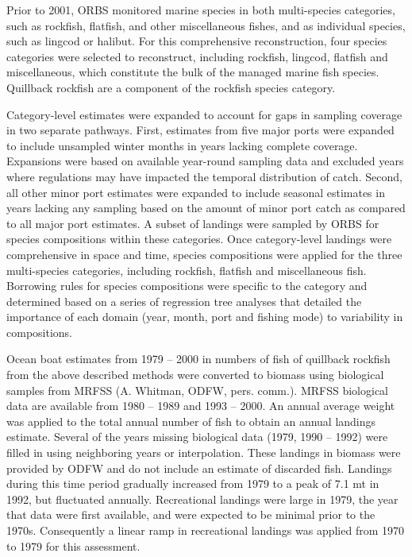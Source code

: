\documentclass[11pt,
  english,
  a4paper,
]{article}
\begin{document}
\leavevmode\tagmcend\tagstructend\par


Prior to 2001, ORBS monitored marine species in both multi-species categories, such as rockfish, flatfish, and other miscellaneous fishes, and as individual species, such as lingcod or halibut. For this comprehensive reconstruction, four species categories were selected to reconstruct, including rockfish, lingcod, flatfish and miscellaneous, which constitute the bulk of the managed marine fish species. Quillback rockfish are a component of the rockfish species category.

\leavevmode\tagmcend\tagstructend\par


Category-level estimates were expanded to account for gaps in sampling coverage in two separate pathways. First, estimates from five major ports were expanded to include unsampled winter months in years lacking complete coverage. Expansions were based on available year-round sampling data and excluded years where regulations may have impacted the temporal distribution of catch. Second, all other minor port estimates were expanded to include seasonal estimates in years lacking any sampling based on the amount of minor port catch as compared to all major port estimates. A subset of landings were sampled by ORBS for species compositions within these categories. Once category-level landings were comprehensive in space and time, species compositions were applied for the three multi-species categories, including rockfish, flatfish and miscellaneous fish. Borrowing rules for species compositions were specific to the category and determined based on a series of regression tree analyses that detailed the importance of each domain (year, month, port and fishing mode) to variability in compositions.

\leavevmode\tagmcend\tagstructend\par


Ocean boat estimates from 1979 -- 2000 in numbers of fish of quillback rockfish from the above described methods were converted to biomass using biological samples from MRFSS (A. Whitman, ODFW, pers. comm.). MRFSS biological data are available from 1980 -- 1989 and 1993 -- 2000. An annual average weight was applied to the total annual number of fish to obtain an annual landings estimate. Several of the years missing biological data (1979, 1990 -- 1992) were filled in using neighboring years or interpolation. These landings in biomass were provided by ODFW and do not include an estimate of discarded fish. Landings during this time period gradually increased from 1979 to a peak of 7.1 mt in 1992, but fluctuated annually. Recreational landings were large in 1979, the year that data were first available, and were expected to be minimal prior to the 1970s. Consequently a linear ramp in recreational landings was applied from 1970 to 1979 for this assessment.
\end{document}
